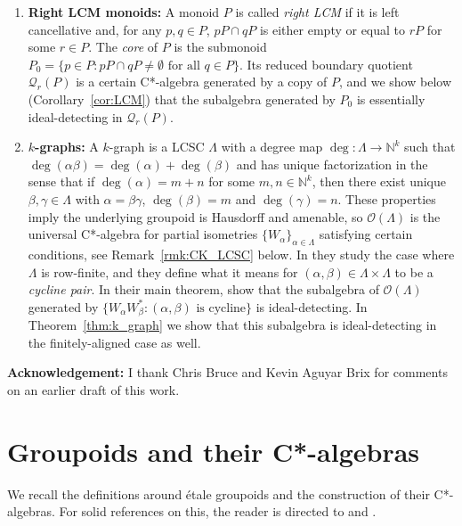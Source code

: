 \documentclass[12pt]{amsart}
\theoremstyle{definition}
\theoremstyle{remark}
\numberwithin{equation}{section}
\newcommand{\mc}{\mathcal}
\newcommand{\NN}{\mathbb{N}}
\newcommand{\cO}{\mathcal{O}}
\renewcommand{\L}{\Lambda}
\renewcommand{\a}{\alpha}
\renewcommand{\b}{\beta}
\newcommand{\ga}{\gamma}
\begin{document}
\begin{enumerate}
	\item {\bf Right LCM monoids:} A monoid $P$ is called {\em right LCM} if it is left cancellative and, for any $p,q\in P$, $pP\cap qP$ is either empty or equal to $rP$ for some $r\in P$. The {\em core} of $P$ is the submonoid $P_0 = \{p\in P: pP\cap qP\neq \emptyset \text{ for all }q\in P\}$. Its reduced boundary quotient $\mc{Q}_r(P)$ is a certain C*-algebra generated by a copy of $P$, and we show below (Corollary~\ref{cor:LCM}) that the subalgebra generated by $P_0$ is essentially ideal-detecting in $\mc{Q}_r(P)$.
	\item {\bf $k$-graphs: } A $k$-graph is a LCSC $\L$ with a degree map $\deg:\L\to \NN^k$ such that $\deg(\a\b) = \deg(\a) + \deg(\b)$ and has unique factorization in the sense that if $\deg(\a) = m+n$ for some $m,n\in\NN^k$, then there exist unique $\b, \ga\in\L$ with $\a = \b\ga$, $\deg(\b) = m$ and $\deg(\ga) = n$. These properties imply the underlying groupoid is Hausdorff and amenable, so $\cO(\L)$ is the universal C*-algebra for partial isometries $\{W_\a\}_{\a\in\L}$ satisfying certain conditions, see Remark~\ref{rmk:CK_LCSC} below. In \cite{BNR14} they study the case where $\L$ is row-finite, and they define what it means for $(\a,\b)\in\L\times\L$ to be a {\em cycline pair}. In their main theorem, show that the subalgebra of $\cO(\L)$ generated by $\{W_\a W_\b^*: (\a,\b)\text{ is cycline}\}$ is ideal-detecting. In Theorem~\ref{thm:k_graph} we show that this subalgebra is ideal-detecting in the finitely-aligned case as well.
\end{enumerate} 

	{\bf Acknowledgement:} I thank Chris Bruce and Kevin Aguyar Brix for comments on an earlier draft of this work.
	
	\section{Groupoids and their C*-algebras}
	We recall the definitions around \'etale groupoids and the construction of their C*-algebras. For solid references on this, the reader is directed to \cite{R80} and \cite{Sim20}.
	
\end{document}

